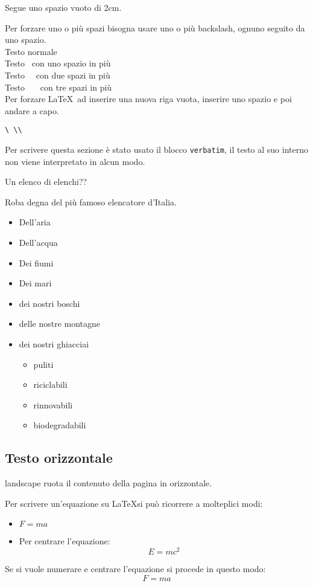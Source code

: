 \documentclass[envcountsame,envcountchap]{svmono}
\begin{document}
Segue uno spazio vuoto di 2cm.

\vspace*{2cm}

Per forzare uno o più spazi bisogna usare uno o più backslash, ognuno seguito da uno spazio.\\
Testo normale\\
Testo \ con uno spazio in più\\
Testo \ \ con due spazi in più\\
Testo \ \ \ con tre spazi in più\\

Per forzare \LaTeX\ ad inserire una nuova riga vuota, inserire uno spazio e poi andare a capo.\\
\begin{verbatim}
\ \\
\end{verbatim}
Per scrivere questa sezione è stato usato il blocco {\tt verbatim}, il testo al suo interno non viene
interpretato in alcun modo.



Un elenco di elenchi??

Roba degna del più famoso elencatore d'Italia.
\begin{itemize}
    \item Dell'aria
    \item Dell'acqua
    \item Dei fiumi
    \item Dei mari
    \item dei nostri boschi
    \item delle nostre montagne
    \item dei nostri ghiacciai
    \begin{itemize}
        \item puliti
        \item riciclabili
        \item rinnovabili
        \item biodegradabili
    \end{itemize} 
\end{itemize}





\newpage
\begin{landscape}
    \section{Testo orizzontale}
    landscape ruota il contenuto della pagina in orizzontale.
    
    Per scrivere un'equazione su \LaTeX si può ricorrere a molteplici modi:
    \begin{itemize}
        \item $F=ma$
        \item Per centrare l'equazione:
        \[E=mc^2\]
    \end{itemize}
    Se si vuole numerare e centrare l'equazione si procede in questo modo:
    \begin{equation}
        F=ma 
    \end{equation}

\end{landscape}
\end{document}
